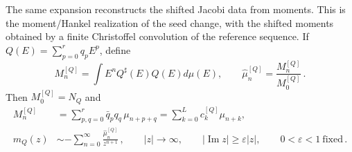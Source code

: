 \documentclass[a4paper,11pt]{article}
\def\dd{d}%
\theoremstyle{definition}
\theoremstyle{remark}
\newcommand{\dd}{\mathrm d}
\newcommand{\Qsh}{Q^{\sharp}}
\begin{document}
The same expansion reconstructs the shifted Jacobi data from moments. This is the moment/Hankel realization of the seed change, with the shifted moments obtained by a finite Christoffel convolution of the reference sequence. If
$Q(E)=\sum_{p=0}^{r}q_pE^p$, define
\begin{equation}
   M_n^{[Q]}
   =
   \int E^n\Qsh(E)Q(E)\dd\mu(E),
   \qquad
   \widehat\mu_n^{[Q]}
   =
   \frac{M_n^{[Q]}}{M_0^{[Q]}}\,.
   \label{eq:shifted-raw-normalized-moments-main}
\end{equation}
Then $M_0^{[Q]}=N_Q$ and 
\begin{equation}
\begin{aligned}
   M_n^{[Q]}
   &=
   \sum_{p,q=0}^{r}\bar q_pq_q\,\mu_{n+p+q}
   =\sum_{k=0}^{L}c_k^{[Q]}\mu_{n+k},\\
   m_Q(z)
   &\sim
   -\sum_{n=0}^{\infty}
   \frac{\widehat\mu_n^{[Q]}}{z^{n+1}}\,,
   \qquad
   |z|\to\infty,\qquad
   |\operatorname{Im}z|\ge\varepsilon|z|,
   \qquad
   0<\varepsilon<1\ \text{fixed}\,.
\end{aligned}
   \label{eq:shifted-moment-compression-main}
\end{equation}
\end{document}
